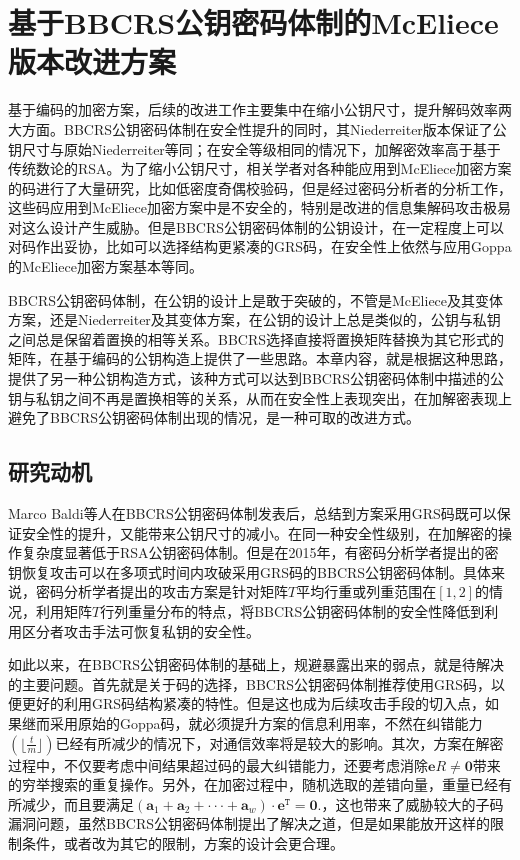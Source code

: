 \chapter{基于BBCRS公钥密码体制的McEliece版本改进方案}
基于编码的加密方案，后续的改进工作主要集中在缩小公钥尺寸，提升解码效率两大方面。BBCRS公钥密码体制在安全性提升的同时，其Niederreiter版本保证了公钥尺寸与原始Niederreiter等同；在安全等级相同的情况下，加解密效率高于基于传统数论的RSA。为了缩小公钥尺寸，相关学者对各种能应用到McEliece加密方案的码进行了大量研究，比如低密度奇偶校验码，但是经过密码分析者的分析工作，这些码应用到McEliece加密方案中是不安全的，特别是改进的信息集解码攻击极易对这么设计产生威胁。但是BBCRS公钥密码体制的公钥设计，在一定程度上可以对码作出妥协，比如可以选择结构更紧凑的GRS码，在安全性上依然与应用Goppa的McEliece加密方案基本等同。

BBCRS公钥密码体制，在公钥的设计上是敢于突破的，不管是McEliece及其变体方案，还是Niederreiter及其变体方案，在公钥的设计上总是类似的，公钥与私钥之间总是保留着置换的相等关系。BBCRS选择直接将置换矩阵替换为其它形式的矩阵，在基于编码的公钥构造上提供了一些思路。本章内容，就是根据这种思路，提供了另一种公钥构造方式，该种方式可以达到BBCRS公钥密码体制中描述的公钥与私钥之间不再是置换相等的关系，从而在安全性上表现突出，在加解密表现上避免了BBCRS公钥密码体制出现的情况，是一种可取的改进方式。

\section{研究动机}
Marco Baldi等人在BBCRS公钥密码体制发表后，总结到方案采用GRS码既可以保证安全性的提升，又能带来公钥尺寸的减小。在同一种安全性级别，在加解密的操作复杂度显著低于RSA公钥密码体制。但是在2015年，有密码分析学者提出的密钥恢复攻击可以在多项式时间内攻破采用GRS码的BBCRS公钥密码体制。具体来说，密码分析学者提出的攻击方案是针对矩阵$T$平均行重或列重范围在$[1,2]$的情况，利用矩阵$T$行列重量分布的特点，将BBCRS公钥密码体制的安全性降低到利用区分者攻击手法可恢复私钥的安全性。

如此以来，在BBCRS公钥密码体制的基础上，规避暴露出来的弱点，就是待解决的主要问题。首先就是关于码的选择，BBCRS公钥密码体制推荐使用GRS码，以便更好的利用GRS码结构紧凑的特性。但是这也成为后续攻击手段的切入点，如果继而采用原始的Goppa码，就必须提升方案的信息利用率，不然在纠错能力$(\lfloor \frac{t}{m} \rfloor)$已经有所减少的情况下，对通信效率将是较大的影响。其次，方案在解密过程中，不仅要考虑中间结果超过码的最大纠错能力，还要考虑消除$\mathbf{e}R \neq \mathbf{0}$带来的穷举搜索的重复操作。另外，在加密过程中，随机选取的差错向量，重量已经有所减少，而且要满足$(\mathbf{a}_1 + \mathbf{a}_2 + ··· + \mathbf{a}_w) \cdot \mathbf{e}^\mathtt{T} = \mathbf{0}.$，这也带来了威胁较大的子码漏洞问题，虽然BBCRS公钥密码体制提出了解决之道，但是如果能放开这样的限制条件，或者改为其它的限制，方案的设计会更合理。

